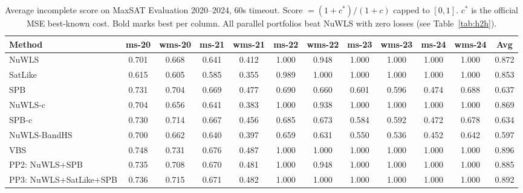 \begin{table}[t]
\centering\small
\caption{Average incomplete score on MaxSAT Evaluation 2020--2024, 60s timeout.
Score $= (1+c^*)/(1+c)$ capped to $[0,1]$.  $c^*$ is the official MSE best-known cost.
Bold marks best per column.  All parallel portfolios beat NuWLS with zero losses
(see Table~\ref{tab:h2h}).}
\label{tab:main}
\begin{tabular}{lcccccccccc|c}\toprule
\textbf{Method} & ms-20 & wms-20 & ms-21 & wms-21 & ms-22 & wms-22 & ms-23 & wms-23 & ms-24 & wms-24 & \textbf{Avg} \\
\midrule
NuWLS & 0.701 & 0.668 & 0.641 & 0.412 & 1.000 & 0.948 & 1.000 & 1.000 & 1.000 & 1.000 & 0.872 \\
SatLike & 0.615 & 0.605 & 0.585 & 0.355 & 0.989 & 1.000 & 1.000 & 1.000 & 1.000 & 1.000 & 0.853 \\
SPB & 0.731 & 0.704 & 0.669 & 0.477 & 0.690 & 0.660 & 0.601 & 0.596 & 0.474 & 0.688 & 0.637 \\
NuWLS-c & 0.704 & 0.656 & 0.641 & 0.383 & 1.000 & 0.938 & 1.000 & 1.000 & 1.000 & 1.000 & 0.869 \\
SPB-c & 0.730 & 0.714 & 0.667 & 0.456 & 0.685 & 0.673 & 0.584 & 0.592 & 0.472 & 0.678 & 0.634 \\
NuWLS-BandHS & 0.700 & 0.662 & 0.640 & 0.397 & 0.659 & 0.631 & 0.550 & 0.536 & 0.452 & 0.642 & 0.597 \\
VBS & 0.748 & 0.731 & 0.676 & 0.487 & 1.000 & 1.000 & 1.000 & 1.000 & 1.000 & 1.000 & 0.896 \\
PP2: NuWLS+SPB & 0.735 & 0.708 & 0.670 & 0.481 & 1.000 & 0.948 & 1.000 & 1.000 & 1.000 & 1.000 & 0.885 \\
PP3: NuWLS+SatLike+SPB & 0.736 & 0.715 & 0.671 & 0.482 & 1.000 & 1.000 & 1.000 & 1.000 & 1.000 & 1.000 & 0.892 \\
\bottomrule
\end{tabular}
\end{table}
